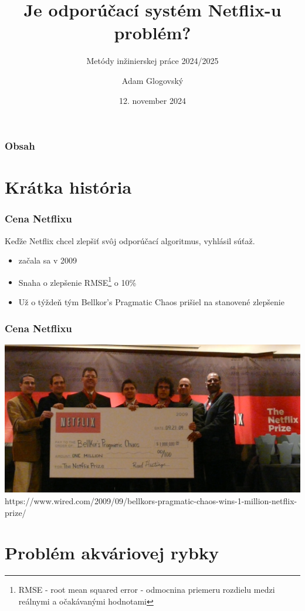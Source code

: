 \documentclass{beamer}
\author{Adam Glogovský}
\institute{
	Fakulta informatiky a informačných technológií\\
	Slovenská technická univerzita v Bratislave}
\subtitle{\vspace{3mm} Metódy inžinierskej práce 2024/2025}
\title{Je odporúčací systém Netflix-u problém?
}
\date{\footnotesize 12. november 2024}
\newcommand{\footcite}[1]{\footnote{\tiny #1}}
\begin{document}
\begin{frame}[fragile=singleslide]
    \titlepage
\end{frame}


\begin{frame}[fragile=singleslide]\frametitle{Obsah}
    \tableofcontents
\end{frame}


\section{Krátka história}

\begin{frame}[fragile=singleslide]\frametitle{Cena Netflixu}
    Keďže Netflix chcel zlepšiť svôj odporúčací algoritmus, vyhlásil súťaž.
    \begin{itemize}
        \item začala sa v 2009
        \item Snaha o zlepšenie RMSE\footcite{RMSE - root mean squared error - odmocnina priemeru rozdielu medzi reálnymi a očakávanými hodnotami} o 10\%

        \item Už o týždeň tým Bellkor's Pragmatic Chaos prišiel na stanovené zlepšenie
    \end{itemize}
\end{frame}

\begin{frame}[fragile=singleslide]\frametitle{Cena Netflixu}

    \includegraphics[scale=.13]{NetflixPrize.png}
    {\tiny https://www.wired.com/2009/09/bellkors-pragmatic-chaos-wins-1-million-netflix-prize/}

    {\tiny }
\end{frame}


\section{Problém akváriovej rybky}
\end{document}
